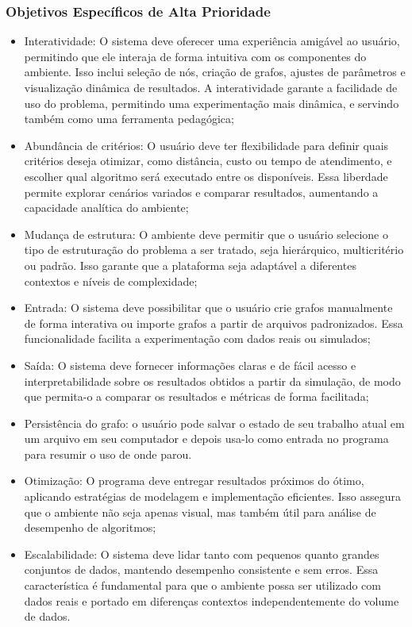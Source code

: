 \subsubsection{Objetivos Específicos de Alta Prioridade}
\begin{itemize}
    \item Interatividade: O sistema deve oferecer uma experiência amigável ao usuário, permitindo que ele interaja de forma intuitiva com os componentes do ambiente. Isso inclui seleção de nós, criação de grafos, ajustes de parâmetros e visualização dinâmica de resultados. A interatividade garante a facilidade de uso do problema, permitindo uma experimentação mais dinâmica, e servindo também como uma ferramenta pedagógica;

    \item Abundância de critérios: O usuário deve ter flexibilidade para definir quais critérios deseja otimizar, como distância, custo ou tempo de atendimento, e escolher qual algoritmo será executado entre os disponíveis. Essa liberdade permite explorar cenários variados e comparar resultados, aumentando a capacidade analítica do ambiente;

    \item Mudança de estrutura: O ambiente deve permitir que o usuário selecione o tipo de estruturação do problema a ser tratado, seja hierárquico, multicritério ou padrão. Isso garante que a plataforma seja adaptável a diferentes contextos e níveis de complexidade;

    \item Entrada: O sistema deve possibilitar que o usuário crie grafos manualmente de forma interativa ou importe grafos a partir de arquivos padronizados. Essa funcionalidade facilita a experimentação com dados reais ou simulados;

    \item Saída: O sistema deve fornecer informações claras e de fácil acesso e interpretabilidade sobre os resultados obtidos a partir da simulação, de modo que permita-o a comparar os resultados e métricas de forma facilitada;
    
    \item Persistência do grafo: o usuário pode salvar o estado de seu trabalho atual em um arquivo em seu computador e depois usa-lo como entrada no programa para resumir o uso de onde parou.
    
    \item Otimização: O programa deve entregar resultados próximos do ótimo, aplicando estratégias de modelagem e implementação eficientes. Isso assegura que o ambiente não seja apenas visual, mas também útil para análise de desempenho de algoritmos;

    \item Escalabilidade: O sistema deve lidar tanto com pequenos quanto grandes conjuntos de dados, mantendo desempenho consistente e sem erros. Essa característica é fundamental para que o ambiente possa ser utilizado com dados reais e portado em diferenças contextos independentemente do volume de dados.
\end{itemize}


